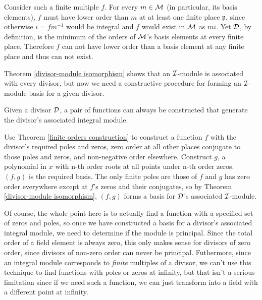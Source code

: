   Consider such a finite multiple $f$.  For every
$m \in {\cal M}$ (in particular, its basis elements), $f$ must have
lower order than $m$ at at least one finite place $\mathfrak{p}$,
since otherwise $i = fm^{-1}$ would be integral and $f$ would exist in
${\cal M}$ as $mi$.  Yet ${\cal D}$, by definition, is the minimum of
the orders of ${\cal M}$'s basis elements at every finite place.
Therefore $f$ can not have lower order than a basis element at any
finite place and thus can not exist.

\endtheorem

Theorem \ref{divisor-module isomorphism} shows that an
${\cal I}$-module is associated with every divisor, but
now we need a constructive procedure for forming an ${\cal I}$-module
basis for a given divisor.

\theorem
\label{divisor basis construction}

Given a divisor ${\cal D}$, a pair of functions can always be
constructed that generate the divisor's associated integral module.

\proof

Use Theorem \ref{finite orders construction} to construct a function
$f$ with the divisor's required poles and zeros, zero order at all
other places conjugate to those poles and zeros, and non-negative
order elsewhere.  Construct $g$, a polynomial in $x$ with n-th order
roots at all points under n-th order zeros.  $(f,g)$ is the required
basis.  The only finite poles are those of $f$ and $g$ has zero order
everywhere except at $f$'s zeros and their conjugates, so by Theorem
\ref{divisor-module isomorphism}, $(f,g)$ forms a basis for
${\cal D}$'s associated ${\cal I}$-module.

\endtheorem


Of course, the whole point here is to actually find a function with a
specified set of zeros and poles, so once we have constructed a basis
for a divisor's associated integral module, we need to determine if
the module is principal.  Since the total order of a field element is
always zero, this only makes sense for divisors of zero order, since
divisors of non-zero order can never be principal.  Futhermore, since
an integral module corresponds to {\it finite} multiples of a divisor,
we can't use this technique to find functions with poles or zeros at
infinity, but that isn't a serious limitation since if we need such a
function, we can just transform into a field with a different point at
infinity.

